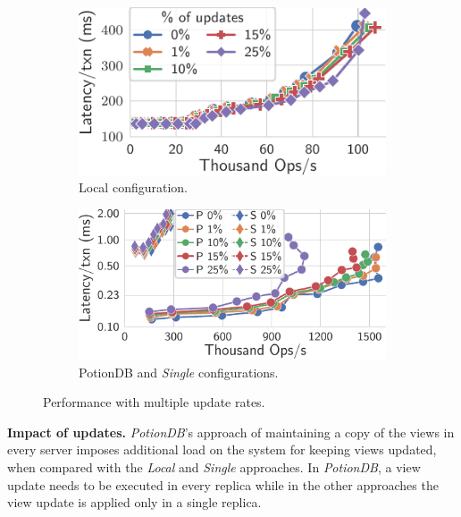 \documentclass[sigplan,twocolumn,review,anonymous]{acmart}
\begin{document}
\begin{figure}
	\centering
	\begin{subfigure}{.47\linewidth}
		\includegraphics[width=1\linewidth]{singleQuery/upd_rate_local_tc_short}
		\caption{Local configuration.}
		\label{fig:update_rates_local_tc}
	\end{subfigure}%
	\hspace*{0.2em}
	\begin{subfigure}{.52\linewidth}
		\includegraphics[width=1\linewidth]{singleQuery/upd_rate_tc_global_vs_single}
		\caption{PotionDB and \textit{Single} configurations.}
		\label{fig:update_rates_global_single_tc}
	\end{subfigure}%
	\vspace*{-0.65em}
	\caption{Performance with multiple update rates.}
	\label{fig:upds_tc}
	\vspace*{-1.2em}
\end{figure}


\noindent
\textbf{Impact of updates.}
\textit{PotionDB}'s approach of maintaining a copy of the views in every server imposes additional load on the system
for keeping views updated,  when compared with the \textit{Local} and \textit{Single} approaches. 
In \textit{PotionDB}, a view update needs to be executed in every replica while in the other approaches the view update 
is applied only in a single replica. 
\end{document}
